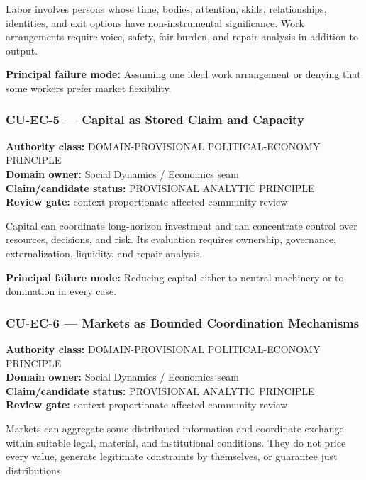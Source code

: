 \documentclass[
  11pt,
]{article}
\begin{document}
Labor involves persons whose time, bodies, attention, skills,
relationships, identities, and exit options have non-instrumental
significance. Work arrangements require voice, safety, fair burden, and
repair analysis in addition to output.

\textbf{Principal failure mode:} Assuming one ideal work arrangement or
denying that some workers prefer market flexibility.

\subsubsection{CU-EC-5 --- Capital as Stored Claim and
Capacity}\label{cu-ec-5-capital-as-stored-claim-and-capacity}

\textbf{Authority class:} DOMAIN-PROVISIONAL POLITICAL-ECONOMY
PRINCIPLE\\
\textbf{Domain owner:} Social Dynamics / Economics seam\\
\textbf{Claim/candidate status:} PROVISIONAL ANALYTIC PRINCIPLE\\
\textbf{Review gate:} context proportionate affected community review

Capital can coordinate long-horizon investment and can concentrate
control over resources, decisions, and risk. Its evaluation requires
ownership, governance, externalization, liquidity, and repair analysis.

\textbf{Principal failure mode:} Reducing capital either to neutral
machinery or to domination in every case.

\subsubsection{CU-EC-6 --- Markets as Bounded Coordination
Mechanisms}\label{cu-ec-6-markets-as-bounded-coordination-mechanisms}

\textbf{Authority class:} DOMAIN-PROVISIONAL POLITICAL-ECONOMY
PRINCIPLE\\
\textbf{Domain owner:} Social Dynamics / Economics seam\\
\textbf{Claim/candidate status:} PROVISIONAL ANALYTIC PRINCIPLE\\
\textbf{Review gate:} context proportionate affected community review

Markets can aggregate some distributed information and coordinate
exchange within suitable legal, material, and institutional conditions.
They do not price every value, generate legitimate constraints by
themselves, or guarantee just distributions.
\end{document}
